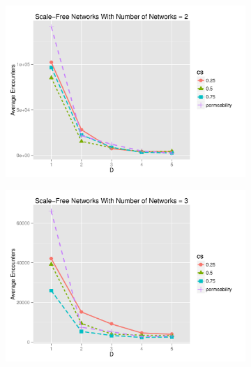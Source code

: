 \documentclass[preprint,number]{elsarticle}
\begin{document}
      \begin{figure}[H]
	\centering
	\begin{subfigure}{.49\linewidth}
          \centering
          \includegraphics[width=1\linewidth]{"../analysis/pdf/context_switching_encounters_comp_sf_groupedbynets_2"}
          \caption{}
          \label{fig:ctx_switching_comp_sf_2}
	\end{subfigure}%
	\begin{subfigure}{.5\linewidth}
          \centering
          \includegraphics[width=1\linewidth]{"../analysis/pdf/context_switching_encounters_comp_sf_groupedbynets_3"}
          \caption{}
          \label{fig:ctx_switching_comp_sf_3}
	\end{subfigure}\\
	\begin{subfigure}{.49\linewidth}

\end{subfigure}
\end{figure}
\end{document}
